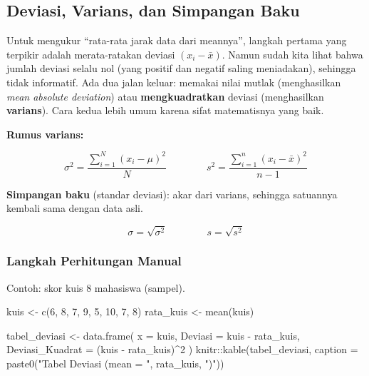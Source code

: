 \documentclass[
  indonesian,
  letterpaper,
]{book}
\newenvironment{Shaded}{\begin{snugshade}}{\end{snugshade}}
\newcommand{\AttributeTok}[1]{\textcolor[rgb]{0.40,0.45,0.13}{#1}}
\newcommand{\DecValTok}[1]{\textcolor[rgb]{0.68,0.00,0.00}{#1}}
\newcommand{\FunctionTok}[1]{\textcolor[rgb]{0.28,0.35,0.67}{#1}}
\newcommand{\NormalTok}[1]{\textcolor[rgb]{0.00,0.23,0.31}{#1}}
\newcommand{\OtherTok}[1]{\textcolor[rgb]{0.00,0.23,0.31}{#1}}
\newcommand{\SpecialCharTok}[1]{\textcolor[rgb]{0.37,0.37,0.37}{#1}}
\newcommand{\StringTok}[1]{\textcolor[rgb]{0.13,0.47,0.30}{#1}}
\begin{document}
\subsection{Deviasi, Varians, dan Simpangan
Baku}\label{deviasi-varians-dan-simpangan-baku}

Untuk mengukur ``rata-rata jarak data dari meannya'', langkah pertama
yang terpikir adalah merata-ratakan deviasi \((x_i - \bar{x})\). Namun
sudah kita lihat bahwa jumlah deviasi selalu nol (yang positif dan
negatif saling meniadakan), sehingga tidak informatif. Ada dua jalan
keluar: memakai nilai mutlak (menghasilkan \emph{mean absolute
deviation}) atau \textbf{mengkuadratkan} deviasi (menghasilkan
\textbf{varians}). Cara kedua lebih umum karena sifat matematisnya yang
baik.

\textbf{Rumus varians:}

\[\sigma^2 = \frac{\sum_{i=1}^{N}(x_i - \mu)^2}{N} \qquad\qquad s^2 = \frac{\sum_{i=1}^{n}(x_i - \bar{x})^2}{n-1}\]

\textbf{Simpangan baku} (standar deviasi): akar dari varians, sehingga
satuannya kembali sama dengan data asli.

\[\sigma = \sqrt{\sigma^2} \qquad\qquad s = \sqrt{s^2}\]

\subsubsection{Langkah Perhitungan
Manual}\label{langkah-perhitungan-manual}

Contoh: skor kuis 8 mahasiswa (sampel).

\begin{Shaded}
\begin{Highlighting}[]
\NormalTok{kuis }\OtherTok{\textless{}{-}} \FunctionTok{c}\NormalTok{(}\DecValTok{6}\NormalTok{, }\DecValTok{8}\NormalTok{, }\DecValTok{7}\NormalTok{, }\DecValTok{9}\NormalTok{, }\DecValTok{5}\NormalTok{, }\DecValTok{10}\NormalTok{, }\DecValTok{7}\NormalTok{, }\DecValTok{8}\NormalTok{)}
\NormalTok{rata\_kuis }\OtherTok{\textless{}{-}} \FunctionTok{mean}\NormalTok{(kuis)}

\NormalTok{tabel\_deviasi }\OtherTok{\textless{}{-}} \FunctionTok{data.frame}\NormalTok{(}
\AttributeTok{x =}\NormalTok{ kuis,}
\AttributeTok{Deviasi =}\NormalTok{ kuis }\SpecialCharTok{{-}}\NormalTok{ rata\_kuis,}
\AttributeTok{Deviasi\_Kuadrat =}\NormalTok{ (kuis }\SpecialCharTok{{-}}\NormalTok{ rata\_kuis)}\SpecialCharTok{\^{}}\DecValTok{2}
\NormalTok{)}
\NormalTok{knitr}\SpecialCharTok{::}\FunctionTok{kable}\NormalTok{(tabel\_deviasi, }\AttributeTok{caption =} \FunctionTok{paste0}\NormalTok{(}\StringTok{"Tabel Deviasi (mean = "}\NormalTok{, rata\_kuis, }\StringTok{")"}\NormalTok{))}
\end{Highlighting}
\end{Shaded}
\end{document}
